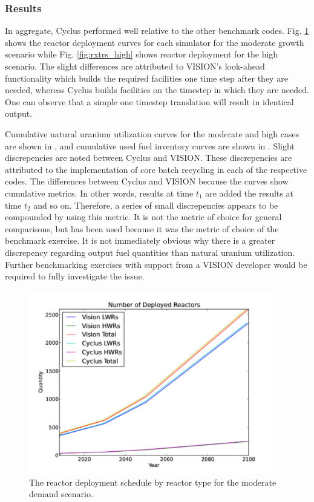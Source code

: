 \subsubsection{Results}


In aggregate, Cyclus performed well relative to the other benchmark
codes. Fig. \ref{fig:rxtrs_low} shows the reactor deployment curves for each
simulator for the moderate growth scenario while Fig. \ref{fig:rxtrs_high} shows
reactor deployment for the high scenario. The slight differences are attributed
to VISION's look-ahead functionality which builds the required facilities one
time step after they are needed, whereas Cyclus builds facilities on the
timestep in which they are needed. One can observe that a simple one timestep
translation will result in identical output.

Cumulative natural uranium utilization curves for the moderate and high cases
are shown in , and cumulative used fuel
inventory curves are shown in
. Slight discrepencies are noted
between Cyclus and VISION. These discrepencies are attributed to the
implementation of core batch recycling in each of the respective codes. The
differences between Cyclus and VISION because the curves show cumulative
metrics. In other words, results at time $t_1$ are added the results at time
$t_2$ and so on. Therefore, a series of small discrepencies appears to be
compounded by using this metric. It is not the metric of choice for general
comparisons, but has been used because it was the metric of choice of the
benchmark exercise. It is not immediately obvious why there is a greater
discrepency regarding output fuel quantities than natural uranium
utilization. Further benchmarking exercises with support from a VISION developer
would be required to fully investigate the issue.

\begin{figure}
  \begin{center}
    \includegraphics[height=8cm]{./figs/rxtrs_low.pdf}
    \caption{The reactor deployment schedule by reactor type for the moderate demand scenario.}
    \label{fig:rxtrs_low}
  \end{center}  
\end{figure}

